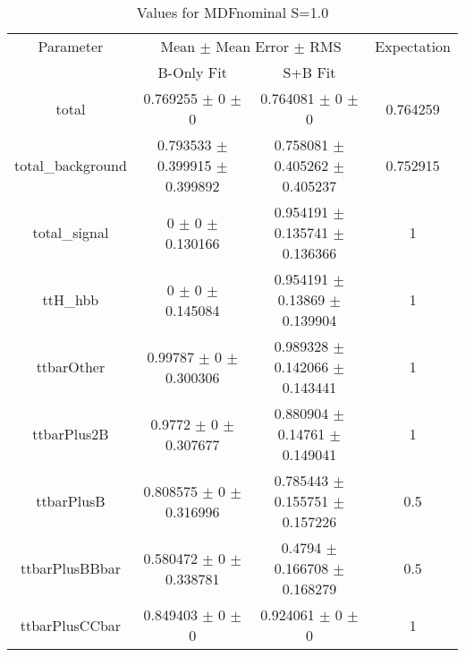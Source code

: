 \begin{table}
\centering
\caption{Values for MDFnominal S=1.0}
\begin{tabular}{cccc}
\toprule
Parameter & \multicolumn{2}{c}{Mean $\pm$ Mean Error $\pm$ RMS} & Expectation\\
 & B-Only Fit & S+B Fit & \\
\midrule
total & \num{0.769255} $\pm$ \num{0} $\pm$ \num{0} & \num{0.764081} $\pm$ \num{0} $\pm$ \num{0} & \num{0.764259}\\
total\_background & \num{0.793533} $\pm$ \num{0.399915} $\pm$ \num{0.399892} & \num{0.758081} $\pm$ \num{0.405262} $\pm$ \num{0.405237} & \num{0.752915}\\
total\_signal & \num{0} $\pm$ \num{0} $\pm$ \num{0.130166} & \num{0.954191} $\pm$ \num{0.135741} $\pm$ \num{0.136366} & \num{1}\\
ttH\_hbb & \num{0} $\pm$ \num{0} $\pm$ \num{0.145084} & \num{0.954191} $\pm$ \num{0.13869} $\pm$ \num{0.139904} & \num{1}\\
ttbarOther & \num{0.99787} $\pm$ \num{0} $\pm$ \num{0.300306} & \num{0.989328} $\pm$ \num{0.142066} $\pm$ \num{0.143441} & \num{1}\\
ttbarPlus2B & \num{0.9772} $\pm$ \num{0} $\pm$ \num{0.307677} & \num{0.880904} $\pm$ \num{0.14761} $\pm$ \num{0.149041} & \num{1}\\
ttbarPlusB & \num{0.808575} $\pm$ \num{0} $\pm$ \num{0.316996} & \num{0.785443} $\pm$ \num{0.155751} $\pm$ \num{0.157226} & \num{0.5}\\
ttbarPlusBBbar & \num{0.580472} $\pm$ \num{0} $\pm$ \num{0.338781} & \num{0.4794} $\pm$ \num{0.166708} $\pm$ \num{0.168279} & \num{0.5}\\
ttbarPlusCCbar & \num{0.849403} $\pm$ \num{0} $\pm$ \num{0} & \num{0.924061} $\pm$ \num{0} $\pm$ \num{0} & \num{1}\\
\bottomrule
\end{tabular}
\end{table}